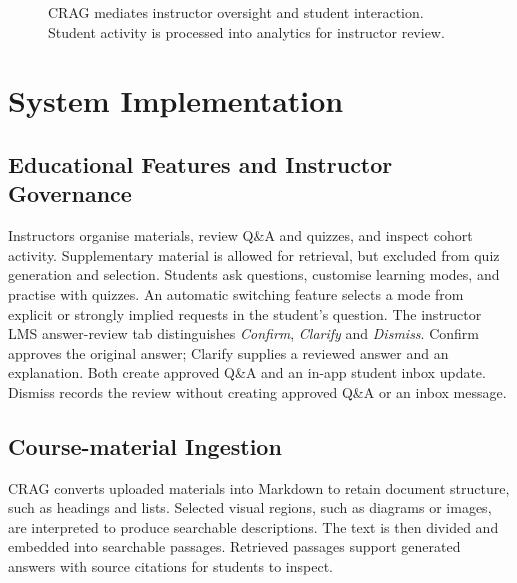 \documentclass[conference]{IEEEtran}
\begin{document}
\begin{figure}[t]
\caption{CRAG mediates instructor oversight and student interaction.
Student activity is processed into analytics for instructor review.}
\label{fig:framework}
\end{figure}

\section{System Implementation}

\subsection{Educational Features and Instructor Governance}
Instructors organise materials, review Q\&A and quizzes, and inspect cohort activity. Supplementary material is allowed for retrieval, but excluded from quiz generation and selection. Students ask questions, customise learning modes, and practise with quizzes. An automatic switching feature selects a mode from explicit or strongly implied requests in the student's question.
The instructor LMS answer-review tab distinguishes \emph{Confirm}, \emph{Clarify} and \emph{Dismiss}. Confirm approves the original answer; Clarify supplies a reviewed answer and an explanation. Both create approved Q\&A and an in-app student inbox update. Dismiss records the review without creating approved Q\&A or an inbox message.

\subsection{Course-material Ingestion}
CRAG converts uploaded materials into Markdown to retain document structure, such as headings and lists. Selected visual regions, such as diagrams or images, are interpreted to produce searchable descriptions. The text is then divided and embedded into searchable passages. Retrieved passages support generated answers with source citations for students to inspect.
\end{document}
